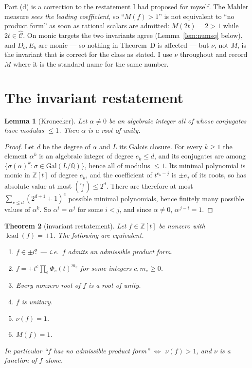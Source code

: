 \documentclass[11pt]{article}
\newtheorem{theorem}{Theorem}[section]
\newtheorem{lemma}[theorem]{Lemma}
\theoremstyle{definition}
\DeclareMathOperator{\lead}{lead}
\newcommand{\ZZ}{\mathbb{Z}}
\newcommand{\QQ}{\mathbb{Q}}
\newcommand{\Chat}{\widehat{\mathcal{C}}}
\begin{document}
Part (d) is a correction to the restatement I had proposed for myself. The Mahler measure
\emph{sees the leading coefficient}, so ``$M(f)>1$'' is not equivalent to ``no product form'' as
soon as rational scalars are admitted: $M(2t)=2>1$ while $2t\in\Chat$. On monic targets the two
invariants agree (Lemma~\ref{lem:numsq} below), and $D_b,E_b$ are monic --- so nothing in
Theorem~D is affected --- but $\nu$, not $M$, is the invariant that is correct for the class as
stated. I use $\nu$ throughout and record $M$ where it is the standard name for the same number.

\section{The invariant restatement}

\begin{lemma}[Kronecker]\label{lem:kronecker}
Let $\alpha\ne0$ be an algebraic integer all of whose conjugates have modulus $\le1$. Then
$\alpha$ is a root of unity.
\end{lemma}

\begin{proof}
Let $d$ be the degree of $\alpha$ and $L$ its Galois closure. For every $k\ge1$ the element
$\alpha^{k}$ is an algebraic integer of degree $e_k\le d$, and its conjugates are among
$\{\sigma(\alpha)^{k}:\sigma\in\mathrm{Gal}(L/\QQ)\}$, hence all of modulus $\le1$. Its minimal
polynomial is monic in $\ZZ[t]$ of degree $e_k$, and the coefficient of $t^{e_k-j}$ is
$\pm e_j$ of its roots, so has absolute value at most $\binom{e_k}{j}\le 2^{d}$. There are
therefore at most $\sum_{e\le d}(2^{d+1}+1)^{e}$ possible minimal polynomials, hence finitely
many possible values of $\alpha^{k}$. So $\alpha^{i}=\alpha^{j}$ for some $i<j$, and since
$\alpha\ne0$, $\alpha^{\,j-i}=1$.
\end{proof}

\begin{theorem}[invariant restatement]\label{thm:restate}
Let $f\in\ZZ[t]$ be nonzero with $\lead(f)=\pm1$. The following are equivalent.
\begin{enumerate}
\item[(i)] $f\in\pm\mathcal{C}$ --- i.e.\ $f$ admits an admissible product form.
\item[(ii)] $f=\pm t^{c}\prod_{e}\Phi_e(t)^{m_e}$ for some integers $c,m_e\ge0$.
\item[(iii)] Every nonzero root of $f$ is a root of unity.
\item[(iv)] $f$ is unitary.
\item[(v)] $\nu(f)=1$.
\item[(vi)] $M(f)=1$.
\end{enumerate}
In particular ``$f$ has no admissible product form'' $\iff$ $\nu(f)>1$, and $\nu$ is a function
of $f$ alone.
\end{theorem}
\end{document}
